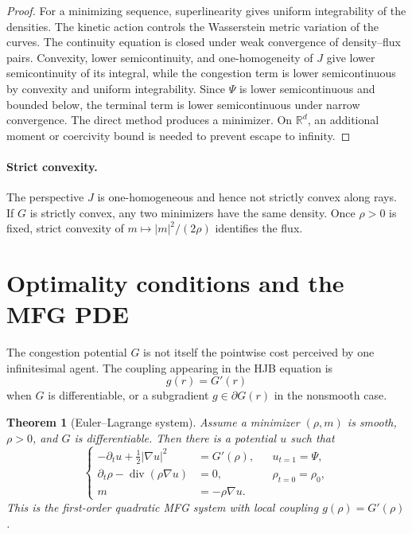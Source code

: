 \documentclass[11pt,a4paper]{article}
\newtheorem{theorem}{Theorem}[section]
\theoremstyle{definition}
\newcommand{\RR}{\mathbb R}
\newcommand{\diverg}{\operatorname{div}}
\newcommand{\abs}[1]{\left\lvert#1\right\rvert}
\begin{document}
\begin{proof}
For a minimizing sequence, superlinearity gives uniform integrability of the
densities. The kinetic action controls the Wasserstein metric variation of the
curves. The continuity equation is closed under weak convergence of
density--flux pairs. Convexity, lower semicontinuity, and one-homogeneity of
\(J\) give lower semicontinuity of its integral, while the congestion term is
lower semicontinuous by convexity and uniform integrability. Since \(\Psi\) is
lower semicontinuous and bounded below, the terminal term is lower
semicontinuous under narrow convergence. The direct method produces a
minimizer. On \(\RR^d\), an additional moment or coercivity bound is needed to
prevent escape to infinity.
\end{proof}

\paragraph{Strict convexity.}
The perspective \(J\) is one-homogeneous and hence not strictly convex along
rays. If \(G\) is strictly convex, any two minimizers have the same density.
Once \(\rho>0\) is fixed, strict convexity of
\(m\mapsto|m|^2/(2\rho)\) identifies the flux.

\section{Optimality conditions and the MFG PDE}

The congestion potential \(G\) is not itself the pointwise cost perceived by
one infinitesimal agent. The coupling appearing in the HJB equation is
\[
  g(r)=G'(r)
\]
when \(G\) is differentiable, or a subgradient \(g\in\partial G(r)\) in the
nonsmooth case.

\begin{theorem}[Euler--Lagrange system]
\label{thm:variational-mfg-kkt}
Assume a minimizer \((\rho,m)\) is smooth, \(\rho>0\), and \(G\) is
differentiable. Then there is a potential \(u\) such that
\begin{equation}\label{eq:variational-mfg-system}
  \left\{
  \begin{aligned}
    -\partial_tu+\frac12\abs{\nabla u}^2&=G'(\rho),
      &&u_{t=1}=\Psi,\\
    \partial_t\rho-\diverg(\rho\nabla u)&=0,
      &&\rho_{t=0}=\rho_0,\\
    m&=-\rho\nabla u.
  \end{aligned}
  \right.
\end{equation}
This is the first-order quadratic MFG system with local coupling
\(g(\rho)=G'(\rho)\).
\end{theorem}
\end{document}
